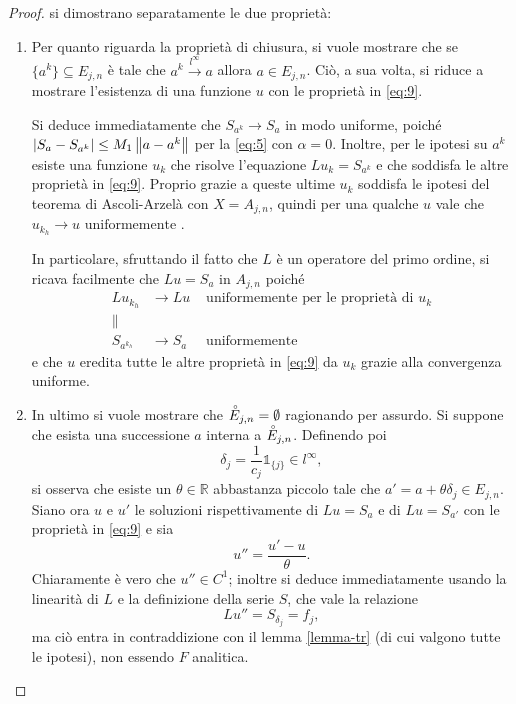 \begin{proof} 
si dimostrano separatamente le due proprietà:
\begin{enumerate}
\item
Per quanto riguarda la proprietà di chiusura, si vuole mostrare che se $\{a^k\}\subseteq E_{j,n}$ è tale che $a^k \xrightarrow{l^\infty} a$ allora $a \in E_{j,n}$. Ciò, a sua volta, si riduce a mostrare l'esistenza di una funzione $u$ con le proprietà in \eqref{eq:9}.

Si deduce immediatamente che $S_{a^k} \rightarrow S_a$ in modo uniforme, poiché $\left|S_a - S_{a^k}\right| \leq M_1 \left\lVert a-a^k\right\rVert$ per la \eqref{eq:5} con $\alpha = 0$. Inoltre, per le ipotesi su $a^k$ esiste una funzione $u_k$ che risolve l'equazione $Lu_k=S_{a^k}$ e che soddisfa le altre proprietà in \eqref{eq:9}. Proprio grazie a queste ultime $u_k$ soddisfa le ipotesi del teorema di Ascoli-Arzelà con $X=A_{j,n}$, quindi per una qualche $u$ vale che $u_{k_h} \rightarrow u \text{ uniformemente }$.

In particolare, sfruttando il fatto che $L$ è un operatore del primo ordine, si ricava facilmente che $Lu=S_a$ in $A_{j,n}$ poiché
\begin{align*}
Lu_{k_h}& \rightarrow Lu &\text{ uniformemente per le proprietà di } u_k\\
\lVert \quad &  &\\
S_{a^{k_h}}& \rightarrow S_a &\text{ uniformemente }
\end{align*}
e che $u$ eredita tutte le altre proprietà in \eqref{eq:9} da $u_k$ grazie alla convergenza uniforme.
 
\item
In ultimo si vuole mostrare che $\accentset{\circ}{E}_{j,n}=\emptyset$ ragionando per assurdo. Si suppone che esista una successione $a$ interna a $\accentset{\circ}{E}_{j,n}$. Definendo poi
$$\delta_j = \frac{1}{c_j} \mathds{1}_{\{j\}} \in l^\infty,$$
si osserva che esiste un $\theta \in \mathbb{R}$ abbastanza piccolo tale che $a'=a+\theta \delta_j \in E_{j,n}$.
Siano ora $u$ e $u'$ le soluzioni rispettivamente di $Lu=S_a$ e di $Lu=S_{a'}$ con le proprietà in \eqref{eq:9} e sia
$$u''=\frac{u'-u}{\theta}.$$ 
Chiaramente è vero che $u'' \in C^1$; inoltre si deduce immediatamente usando la linearità di $L$ e la definizione della serie $S$, che vale la relazione $$Lu''=S_{\delta_j}=f_j,$$ ma ciò entra in contraddizione con il lemma \ref{lemma-tr} (di cui valgono tutte le ipotesi), non essendo $F$ analitica. 
\end{enumerate}
\end{proof}


